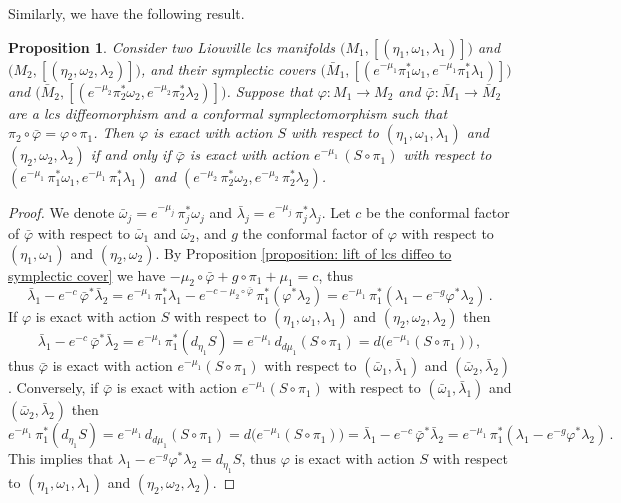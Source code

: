 \documentclass{amsart}
\newtheorem{prop}[thm]{Proposition}
\theoremstyle{remark}
\begin{document}
Similarly,
we have the following result.

\begin{prop}\label{proposition: lift of exact isotopy to symplectic cover}
Consider two Liouville lcs manifolds
$\big(M_1 , [(\eta_1, \omega_1, \lambda_1)]\big)$
and $\big(M_2 , [(\eta_2, \omega_2, \lambda_2)]\big)$,
and their symplectic covers
$\big(\bar{M}_1, [(e^{-\mu_1}\pi_1^* \omega_1, e^{-\mu_1}\pi_1^* \lambda_1)]\big)$
and $\big(\bar{M}_2, [(e^{-\mu_2}\pi_2^* \omega_2, e^{-\mu_2}\pi_2^* \lambda_2)]\big)$.
Suppose that $\varphi: M_1 \rightarrow M_2$
and $\bar{\varphi}: \bar{M}_1 \rightarrow \bar{M}_2$
are a lcs diffeomorphism
and a conformal symplectomorphism
such that $\pi_2 \circ \bar{\varphi} = \varphi \circ \pi_1$.
Then $\varphi$ is exact with action $S$
with respect to $(\eta_1, \omega_1, \lambda_1)$
and $(\eta_2, \omega_2, \lambda_2)$
if and only if $\bar{\varphi}$ is exact
with action $e^{-\mu_1} \, (S \circ \pi_1)$
with respect to $(e^{-\mu_1} \, \pi_1^{\ast}\omega_1, e^{-\mu_1} \, \pi_1^{\ast}\lambda_1)$
and $(e^{-\mu_2} \, \pi_2^{\ast}\omega_2, e^{-\mu_2} \, \pi_2^{\ast}\lambda_2)$.
\end{prop}

\begin{proof}
We denote $\bar{\omega}_j = e^{-\mu_j} \, \pi_j^{\ast}\omega_j$
and $\bar{\lambda}_j = e^{-\mu_j} \, \pi_j^{\ast}\lambda_j$.
Let $c$ be the conformal factor of $\bar{\varphi}$
with respect to $\bar{\omega}_1$
and $\bar{\omega}_2$,
and $g$ the conformal factor of $\varphi$
with respect to $(\eta_1, \omega_1)$
and $(\eta_2, \omega_2)$.
By Proposition \ref{proposition: lift of lcs diffeo to symplectic cover}
we have $- \mu_2 \circ \bar{\varphi} + g \circ \pi_1 + \mu_1 = c$,
thus
\[
\bar{\lambda}_1
- e^{-c} \, \bar{\varphi}^{\ast} \bar{\lambda}_2
= e^{-\mu_1} \, \pi_1^{\ast}\lambda_1 
- e^{-c -\mu_2 \circ \bar{\varphi}} \, \pi_1^{\ast} (\varphi^{\ast} \lambda_2)
= e^{-\mu_1} \, \pi_1^{\ast} (\lambda_1 - e^{-g} \varphi^{\ast}\lambda_2 ) \,.
\]
If $\varphi$ is exact with action $S$
with respect to $(\eta_1, \omega_1, \lambda_1)$
and $(\eta_2, \omega_2, \lambda_2)$
then
\[
\bar{\lambda}_1
- e^{-c} \, \bar{\varphi}^{\ast} \bar{\lambda}_2
= e^{-\mu_1} \, \pi_1^{\ast} (d_{\eta_1}S )
= e^{-\mu_1} \, d_{d\mu_1} (S \circ \pi_1)
= d \big(e^{-\mu_1} (S \circ \pi_1)\big) \,,
\]
thus $\bar{\varphi}$ is exact
with action $e^{-\mu_1} (S \circ \pi_1)$
with respect to $(\bar{\omega}_1, \bar{\lambda}_1)$
and $(\bar{\omega}_2, \bar{\lambda}_2)$.
Conversely,
if $\bar{\varphi}$ is exact
with action $e^{-\mu_1} (S \circ \pi_1)$
with respect to $(\bar{\omega}_1, \bar{\lambda}_1)$
and $(\bar{\omega}_2, \bar{\lambda}_2)$
then
\[
e^{-\mu_1} \, \pi_1^{\ast} (d_{\eta_1}S )
= e^{-\mu_1} \, d_{d\mu_1} (S \circ \pi_1)
= d \big(e^{-\mu_1} (S \circ \pi_1)\big)
= \bar{\lambda}_1
- e^{-c} \, \bar{\varphi}^{\ast} \bar{\lambda}_2
= e^{-\mu_1} \, \pi_1^{\ast} (\lambda_1 - e^{-g} \varphi^{\ast}\lambda_2 ) \,.
\]
This implies that 
$\lambda_1 - e^{-g} \varphi^{\ast} \lambda_2 = d_{\eta_1} S$,
thus $\varphi$ is exact
with action $S$ with respect to $(\eta_1, \omega_1, \lambda_1)$
and $(\eta_2, \omega_2, \lambda_2)$.
\end{proof}
\end{document}
